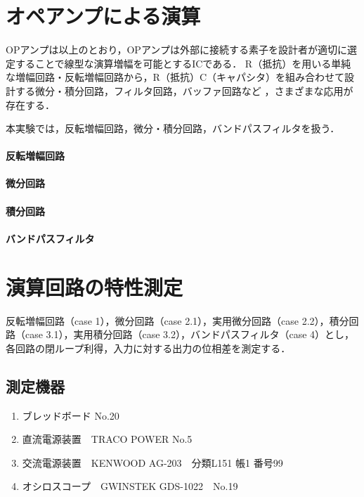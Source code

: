 \documentclass[dvipdfmx,titlepage,a4j]{jsarticle}  %
\begin{document}
\section{オペアンプによる演算}
OPアンプは以上のとおり，OPアンプは外部に接続する素子を設計者が適切に選定することで線型な演算増幅を可能とするICである．
R（抵抗）を用いる単純な増幅回路・反転増幅回路から，R（抵抗）C（キャパシタ）を組み合わせて設計する微分・積分回路，フィルタ回路，バッファ回路など
，さまざまな応用が存在する．

本実験では，反転増幅回路，微分・積分回路，バンドパスフィルタを扱う．

\paragraph{反転増幅回路\\}

\paragraph{微分回路\\}

\paragraph{積分回路\\}

\paragraph{バンドパスフィルタ\\}

\section{演算回路の特性測定}
反転増幅回路（case 1），微分回路（case 2.1），実用微分回路（case 2.2），積分回路（case 3.1），実用積分回路（case 3.2），バンドパスフィルタ（case 4）とし，
各回路の閉ループ利得，入力に対する出力の位相差を測定する．
\subsection{測定機器}
\begin{enumerate}
  \item ブレッドボード No.20
  \item 直流電源装置　TRACO POWER No.5
  \item 交流電源装置　KENWOOD AG-203　分類L151 帳1 番号99
  \item オシロスコープ　GWINSTEK GDS-1022　No.19
\end{enumerate}
\end{document}
